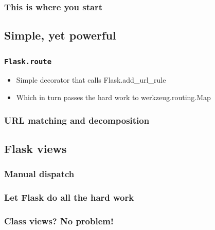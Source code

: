 \documentclass{beamer}
\begin{document}
\begin{frame}[fragile]
  \frametitle{This is where you start}
\end{frame}

\subsection{Simple, yet powerful}

\begin{frame}
  \frametitle{\texttt{Flask.route}}
  \begin{itemize}
  \item Simple decorator that calls Flask.add\_url\_rule
  \item Which in turn passes the hard work to werkzeug.routing.Map
  \end{itemize}
\end{frame}

\begin{frame}
  \frametitle{URL matching and decomposition}
\end{frame}

\subsection{Flask views}

\begin{frame}
  \frametitle{Manual dispatch}
\end{frame}

\begin{frame}
  \frametitle{Let Flask do all the hard work}
\end{frame}

\begin{frame}
  \frametitle{Class views? No problem!}
\end{frame}
\end{document}
